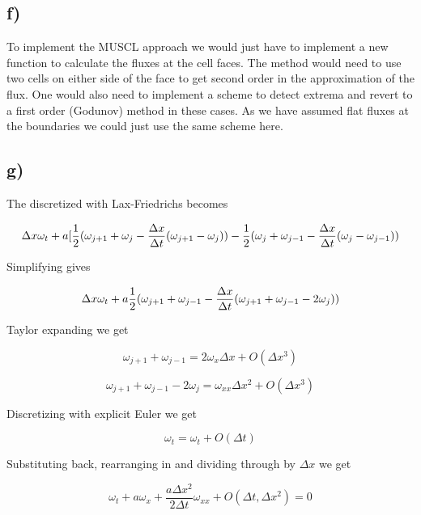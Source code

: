 \documentclass{article}
\begin{document}
\subsection{f)}
To implement the MUSCL approach we would just have to implement a new function to calculate the fluxes at the cell faces. The method would need to use two cells on either side of the face to get second order in the approximation of the flux. One would also need to implement a scheme to detect extrema and revert to a first order (Godunov) method in these cases. As we have assumed flat fluxes at the boundaries we could just use the same scheme here.

\subsection{g)}

The discretized with Lax-Friedrichs becomes 

\begin{equation}
\Delta x \omega_t + a [\frac{1}{2}(\omega_{j+1} + \omega_j - \frac{\Delta x}{\Delta t}(\omega_{j+1} - \omega_j) ) - \frac{1}{2}(\omega_{j} + \omega_{j-1} - \frac{\Delta x}{\Delta t}(\omega_{j} - \omega_{j-1}) ) 
\end{equation}

Simplifying gives

\begin{equation}
\Delta x \omega_t + a \frac{1}{2}(\omega_{j+1} + \omega_{j-1} - \frac{\Delta x}{\Delta t}(\omega_{j+1} + \omega_{j-1} - 2\omega_j) ) 
\end{equation}

Taylor expanding we get

\begin{equation}
\omega_{j+1} + \omega_{j-1}  = 2 \omega_x \Delta x + O(\Delta x^3)
\end{equation}

\begin{equation}
\omega_{j+1} + \omega_{j-1} - 2\omega_j = \omega_{xx} \Delta x^2 + O(\Delta x^3)
\end{equation}

Discretizing with explicit Euler we get

\begin{equation}
\omega_t = \omega_t + O(\Delta t)
\end{equation}

Substituting back, rearranging in and dividing through by $\Delta x$ we get

\begin{equation}
	\omega_t + a \omega_x + \frac{a\Delta x^2}{2\Delta t}\omega_{xx} + O(\Delta t, \Delta x^2) = 0
\end{equation}
\end{document}
